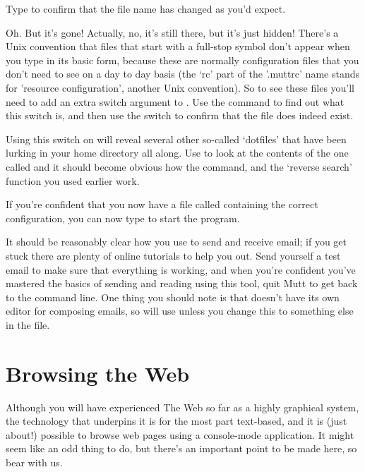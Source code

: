 Type  to confirm that the file name has changed as you'd expect. 

Oh. But it's gone! Actually, no, it's still there, but it's just hidden! There's a Unix convention that files that start with a full-stop symbol don't appear when you type  in its basic form, because these are normally configuration files that you don't need to see on a day to day basis (the `rc' part of the '.muttrc' name stands for 'resource configuration', another Unix convention). So to see these files you'll need to add an extra switch argument to . Use the  command to find out what this switch is, and then use the switch to confirm that the  file does indeed exist. 

Using this switch on  will reveal several other so-called `dotfiles' that have been lurking in your home directory all along. Use  to look at the contents of the one called  and it should become obvious how the  command, and the `reverse search' function you used earlier work.

If you're confident that you now have a file called  containing the correct configuration, you can now type  to start the program. 

It should be reasonably clear how you use  to send and receive email; if you get stuck there are plenty of online tutorials to help you out. Send yourself a test email to make sure that everything is working, and when you're confident you've mastered the basics of sending and reading using this tool, quit Mutt to get back to the command line. One thing you should note is that  doesn't have its own editor for composing emails, so will use  unless you change this to something else in the  file. 

\section{Browsing the Web}

Although you will have experienced The Web so far as a highly graphical system, the technology that underpins it is for the most part text-based, and it is (just about!) possible to browse web pages using a console-mode application. It might seem like an odd thing to do, but there's an important point to be made here, so bear with us.


